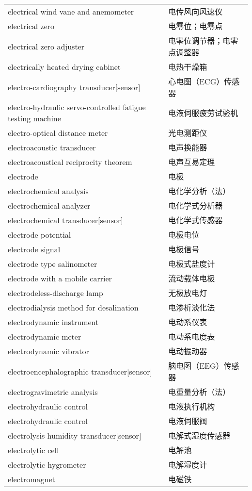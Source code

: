 \documentclass[
]{article}
\begin{document}
\begin{longtable}[]{@{}ll@{}}
electrical wind vane and anemometer & 电传风向风速仪 \\
electrical zero & 电零位；电零点 \\
electrical zero adjuster & 电零位调节器；电零点调整器 \\
electrically heated drying cabinet & 电热干燥箱 \\
electro-cardiography transducer{[}sensor{]} & 心电图（ECG）传感器 \\
electro-hydraulic servo-controlled fatigue testing machine &
电液伺服疲劳试验机 \\
electro-optical distance meter & 光电测距仪 \\
electroacoustic transducer & 电声换能器 \\
electroacoustical reciprocity theorem & 电声互易定理 \\
electrode & 电极 \\
electrochemical analysis & 电化学分析（法） \\
electrochemical analyzer & 电化学式分析器 \\
electrochemical transducer{[}sensor{]} & 电化学式传感器 \\
electrode potential & 电极电位 \\
electrode signal & 电极信号 \\
electrode type salinometer & 电极式盐度计 \\
electrode with a mobile carrier & 流动载体电极 \\
electrodeless-discharge lamp & 无极放电灯 \\
electrodialysis method for desalination & 电渗析淡化法 \\
electrodynamic instrument & 电动系仪表 \\
electrodynamic meter & 电动系电度表 \\
electrodynamic vibrator & 电动振动器 \\
electroencephalographic transducer{[}sensor{]} & 脑电图（EEG）传感器 \\
electrogravimetric analysis & 电重量分析（法） \\
electrohydraulic control & 电液执行机构 \\
electrohydraulic control & 电液伺服阀 \\
electrolysis humidity transducer{[}sensor{]} & 电解式湿度传感器 \\
electrolytic cell & 电解池 \\
electrolytic hygrometer & 电解湿度计 \\
electromagnet & 电磁铁 \\

\end{longtable}
\end{document}

